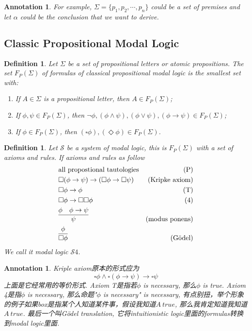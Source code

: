 \documentclass{article}
\theoremstyle{plain}
\newtheorem{definition}[theorem]{Definition}
\newtheorem{annotation}[theorem]{Annotation}
\theoremstyle{nonumberplain}
\begin{document}
\begin{annotation}
\rm For example, $\Sigma = \{p_1,p_2,\cdots,p_n\}$ could be a set of premises and let $\alpha$ could be the conclusion that we want to derive. 
\end{annotation}

\newpage
\subsection{Classic Propositional Modal Logic}


\begin{definition}
\rm \cite{15-816-cml}Let $\Sigma$ be a set of propositional letters or atomic propositions. The set $F_P(\Sigma)$ of formulas of classical propositional modal logic is the smallest set with:
\begin{enumerate}
	\item If $A \in \Sigma$ is a propositional letter, then $A \in F_P(\Sigma)$;
	\item If $\phi,\psi \in F_P(\Sigma)$, then $\neg \phi, (\phi \wedge \psi), (\phi \vee \psi), (\phi \to \psi) \in F_P(\Sigma)$;
	\item If $\phi \in F_P(\Sigma)$, then $(\square \phi),(\Diamond \phi) \in F_P(\Sigma)$. 
\end{enumerate}
\end{definition}

\begin{definition}
\rm Let $\mathcal{S}$ be a system of modal logic, this is $F_P(\Sigma)$ with a set of axioms and rules. If axioms and rules as follow
$$
\begin{aligned}
&\text{all propostional tautologies}&(\text{P}) \\
&\square(\phi \to \psi) \to (\square\phi \to \square\psi)& (\text{Kripke axiom})\\
&\square\phi \to \phi & (\text{T}) \\
&\square\phi \to \square\square\phi &(4) \\
&\infer{\psi}{\phi & \phi \to \psi} & (\text{modus ponens})\\
&\infer{\square \phi}{\phi} & (\text{G\"{o}del}) 
\end{aligned}
$$
We call it modal logic $\mathcal{S}4$.
\end{definition}


\begin{annotation}
\rm Kriple axiom原本的形式应为
$$
\square \phi \wedge \square(\phi \to \psi) \to \square \psi
$$
上面是它经常用的等价形式. Axiom T是指若$\phi$ is necessary, 那么$\phi$ is true. Axiom 4是指$\phi$ is necessary, 那么命题"$\phi$ is necessary" is necessary, 有点别扭，举个形象的例子如果box是指某个人知道某件事，假设我知道$A~true$, 那么我肯定知道我知道$A~true$. 最后一个叫G\"{o}del translation, 它将intuitionistic logic里面的formulas转换到modal logic里面. 
\end{annotation}
\end{document}
